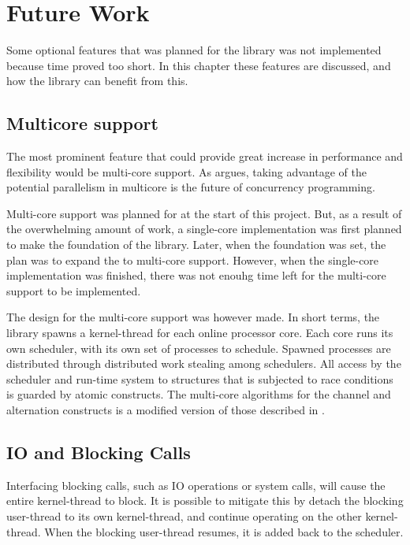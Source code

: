 
\chapter{Future Work}
\label{ch:future_work}

Some optional features that was planned for the library was not implemented because time proved too short. In this chapter these features are discussed, and how the library can benefit from this. 

\section{Multicore support}

The most prominent feature that could provide great increase in performance and flexibility would be multi\hyp{}core support. As \citet{c++csp2} argues, taking advantage of the potential parallelism in multicore is the future of concurrency programming.

Multi\hyp{}core support was planned for at the start of this project. But, as a result of the overwhelming amount of work, a single\hyp{}core implementation was first planned to make the foundation of the library. Later, when the foundation was set, the plan was to expand the to multi\hyp{}core support. However, when the single\hyp{}core implementation was finished, there was not enouhg time left for the multi\hyp{}core support to be implemented.

The design for the multi\hyp{}core support was however made. In short terms, the library spawns a kernel\hyp{}thread for each online processor core. Each core runs its own scheduler, with its own set of processes to schedule. Spawned processes are distributed through distributed work stealing among schedulers. All access by the scheduler and run\hyp{}time system to structures that is subjected to race conditions is guarded by atomic constructs. The multi\hyp{}core algorithms for the channel and alternation constructs is a modified version of those described in \citet{c++csp2}.

\section{IO and Blocking Calls}

Interfacing blocking calls, such as IO operations or system calls, will cause the entire kernel\hyp{}thread to block. It is possible to mitigate this by detach the blocking user\hyp{}thread to its own kernel\hyp{}thread, and continue operating on the other kernel\hyp{}thread. When the blocking user\hyp{}thread resumes, it is added back to the scheduler.

